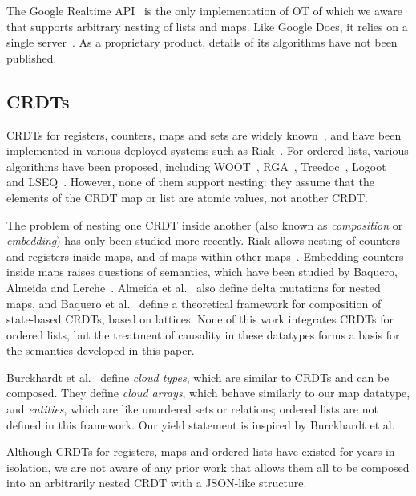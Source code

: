 \documentclass[10pt,journal,compsoc]{IEEEtran}
\begin{document}
The Google Realtime API~\cite{Google:2015vk} is the only implementation of OT of which we aware that supports arbitrary nesting of lists and maps. Like Google Docs, it relies on a single server~\cite{Lemonik:2016wh}. As a proprietary product, details of its algorithms have not been published.

\subsection{CRDTs}\label{sec:related-crdts}

CRDTs for registers, counters, maps and sets are widely known~\cite{Shapiro:2011un,Shapiro:2011wy}, and have been implemented in various deployed systems such as Riak~\cite{Brown:2014hs,Brown:2013wy}. For ordered lists, various algorithms have been proposed, including WOOT~\cite{Oster:2006wj}, RGA~\cite{Roh:2011dw}, Treedoc~\cite{Preguica:2009fz}, Logoot~\cite{Weiss:2010hx} and LSEQ~\cite{Nedelec:2013ky}. However, none of them support nesting: they assume that the elements of the CRDT map or list are atomic values, not another CRDT.

The problem of nesting one CRDT inside another (also known as \emph{composition} or \emph{embedding}) has only been studied more recently. Riak allows nesting of counters and registers inside maps, and of maps within other maps~\cite{Brown:2014hs,Brown:2013wy}. Embedding counters inside maps raises questions of semantics, which have been studied by Baquero, Almeida and Lerche~\cite{Baquero:2016iv}. Almeida et al.~\cite{Almeida:2016tk} also define delta mutations for nested maps, and Baquero et al.~\cite{Baquero:2015tm} define a theoretical framework for composition of state-based CRDTs, based on lattices. None of this work integrates CRDTs for ordered lists, but the treatment of causality in these datatypes forms a basis for the semantics developed in this paper.

Burckhardt et al.~\cite{Burckhardt:2012jy} define \emph{cloud types}, which are similar to CRDTs and can be composed. They define \emph{cloud arrays}, which behave similarly to our map datatype, and \emph{entities}, which are like unordered sets or relations; ordered lists are not defined in this framework. Our \textsf{yield} statement is inspired by Burckhardt et al.

Although CRDTs for registers, maps and ordered lists have existed for years in isolation, we are not aware of any prior work that allows them all to be composed into an arbitrarily nested CRDT with a JSON-like structure.
\end{document}
